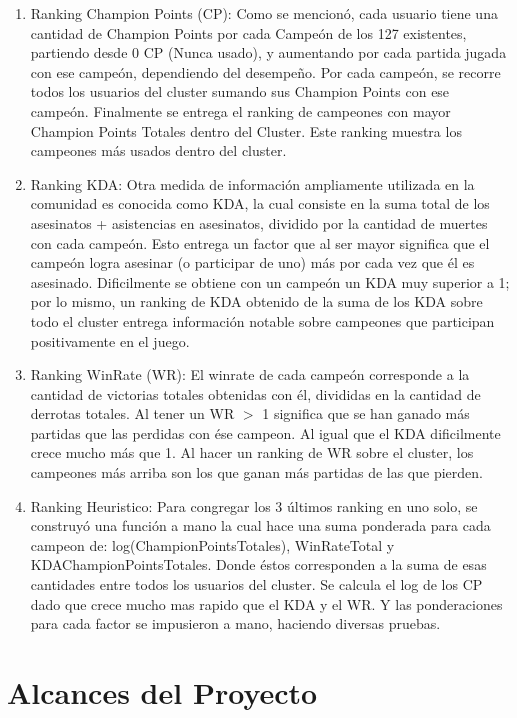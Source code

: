 \documentclass[letterpaper,11pt, spanish]{article}
\begin{document}
\begin{enumerate}
	\item Ranking Champion Points (CP): Como se mencionó, cada usuario tiene una cantidad de Champion Points por cada Campeón de los 127 existentes, partiendo desde 0 CP (Nunca usado), y aumentando por cada partida jugada con ese campeón, dependiendo del desempeño. Por cada campeón, se recorre todos los usuarios del cluster sumando sus Champion Points con ese campeón. Finalmente se entrega el ranking de campeones con mayor Champion Points Totales dentro del Cluster. Este ranking muestra los campeones más usados dentro del cluster.

	\item Ranking KDA: Otra medida de información ampliamente utilizada en la comunidad es conocida como KDA, la cual consiste en la suma total de los asesinatos + asistencias en asesinatos, dividido por la cantidad de muertes con cada campeón. Esto entrega un factor que al ser mayor significa que el campeón logra asesinar (o participar de uno) más por cada vez que él es asesinado. Dificilmente se obtiene con un campeón un KDA muy superior a 1; por lo mismo, un ranking de KDA obtenido de la suma de los KDA sobre todo el cluster entrega información notable sobre campeones que participan positivamente en el juego.
	\item Ranking WinRate (WR): El winrate de cada campeón corresponde a la cantidad de victorias totales obtenidas con él, divididas en la cantidad de derrotas totales. Al tener un WR $>$ 1 significa que se han ganado más partidas que las perdidas con ése campeon. Al igual que el KDA dificilmente crece mucho más que 1. Al hacer un ranking de WR sobre el cluster, los campeones más arriba son los que ganan más partidas de las que pierden.
	\item Ranking Heuristico: Para congregar los 3 últimos ranking en uno solo, se construyó una función a mano la cual hace una suma ponderada para cada campeon de: log(ChampionPointsTotales), WinRateTotal y KDAChampionPointsTotales. Donde éstos  corresponden a la suma de esas cantidades entre todos los usuarios del cluster. Se calcula el log de los CP dado que crece mucho mas rapido que el KDA y el WR. Y las ponderaciones para cada factor se impusieron a mano, haciendo diversas pruebas.
\end{enumerate}

\section{Alcances del Proyecto}
\end{document}
